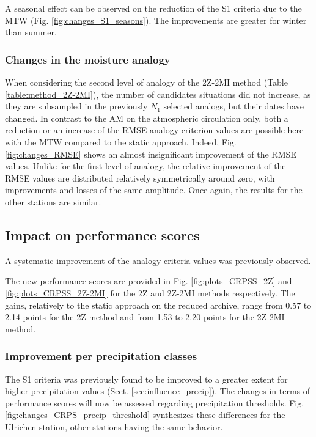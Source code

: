 \documentclass[hess, manuscript]{copernicus}
\begin{document}
A seasonal effect can be observed on the reduction of the S1 criteria due to the MTW (Fig. \ref{fig:changes_S1_seasons}). The improvements are greater for winter than summer. 


\subsubsection{Changes in the moisture analogy}

When considering the second level of analogy of the 2Z-2MI method (Table \ref{table:method_2Z-2MI}), the number of candidates situations did not increase, as they are subsampled in the previously $N_{1}$ selected analogs, but their dates have changed. In contrast to the AM on the atmospheric circulation only, both a reduction or an increase of the RMSE analogy criterion values are possible here with the MTW compared to the static approach. Indeed, Fig. \ref{fig:changes_RMSE} shows an almost insignificant improvement of the RMSE values. Unlike for the first level of analogy, the relative improvement of the RMSE values are distributed relatively symmetrically around zero, with improvements and losses of the same amplitude. Once again, the results for the other stations are similar.


\subsection{Impact on performance scores}
\label{sec:influence_scores}

A systematic improvement of the analogy criteria values was previously observed. 

The new performance scores are provided in Fig. \ref{fig:plots_CRPSS_2Z} and \ref{fig:plots_CRPSS_2Z-2MI} for the 2Z and 2Z-2MI methods respectively. The gains, relatively to the static approach on the reduced archive, range from 0.57 to 2.14 points for the 2Z method and from 1.53 to 2.20 points for the 2Z-2MI method. 


\subsubsection{Improvement per precipitation classes}
\label{sec:improvement_CRPSS_precip_threshold}

The S1 criteria was previously found to be improved to a greater extent for higher precipitation values (Sect. \ref{sec:influence_precip}). The changes in terms of performance scores will now be assessed regarding precipitation thresholds. Fig. \ref{fig:changes_CRPS_precip_threshold} synthesizes these differences for the Ulrichen station, other stations having the same behavior.
\end{document}
